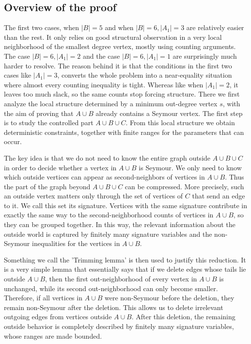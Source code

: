 \documentclass[a4paper,fleqn]{cas-sc}
\theoremstyle{definition}
\begin{document}
\subsection*{Overview of the proof}
The first two cases, when $|B|=5$ and when $|B|=6, |A_1|=3$ are relatively easier than the rest. It only relies on good structural observation in a very local neighborhood of the smallest degree vertex, mostly using counting arguments. The case $|B|=6, |A_1|=2$ and the case $|B|=6, |A_1|=1$ are surprisingly much harder to resolve. The reason behind it is that the conditions in the first two cases like $|A_1|=3$, converts the whole problem into a near-equality situation where almost every counting inequality is tight. Whereas like when $|A_1|=2$, it leaves too much slack, so the same counts stop forcing structure.
There we first analyze the local structure determined by a minimum out-degree vertex \(s\), with the aim of proving that \(A\cup B\) already contains a Seymour vertex. The first step is to study the controlled part \(A\cup B\cup C\). From this local structure we obtain deterministic constraints, together with finite ranges for the parameters that can occur.

The key idea is that we do not need to know the entire graph outside \(A\cup B\cup C\) in order to decide whether a vertex in \(A\cup B\) is Seymour. We only need to know which outside vertices can appear as second-neighbors of vertices in \(A\cup B\). Thus the part of the graph beyond \(A\cup B\cup C\) can be compressed. More precisely, such an outside vertex matters only through the set of vertices of \(C\) that send an edge to it. We call this set its signature. Vertices with the same signature contribute in exactly the same way to the second-neighborhood counts of vertices in \(A\cup B\), so they can be grouped together. In this way, the relevant information about the outside world is captured by finitely many signature variables and the non-Seymour inequalities for the vertices in \(A\cup B\).

Something we call the 'Trimming lemma' is then used to justify this reduction. It is a very simple lemma that essentially says that if we delete edges whose tails lie outside \(A\cup B\), then the first out-neighborhood of every vertex in \(A\cup B\) is unchanged, while its second out-neighborhood can only become smaller. Therefore, if all vertices in \(A\cup B\) were non-Seymour before the deletion, they remain non-Seymour after the deletion. This allows us to delete irrelevant outgoing edges from vertices outside \(A\cup B\). After this deletion, the remaining outside behavior is completely described by finitely many signature variables, whose ranges are made bounded.
\end{document}
